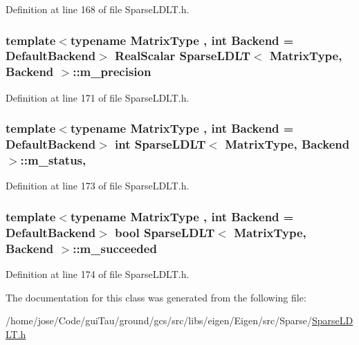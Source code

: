 Definition at line 168 of file Sparse\-L\-D\-L\-T.\-h.

\hypertarget{class_sparse_l_d_l_t_a109b6c84b18d97c92a08379d373a7975}{
\subsubsection[{m\-\_\-precision}]{\setlength{\rightskip}{0pt plus 5cm}template$<$typename Matrix\-Type , int Backend = Default\-Backend$>$ {\bf Real\-Scalar} {\bf Sparse\-L\-D\-L\-T}$<$ Matrix\-Type, Backend $>$\-::m\-\_\-precision\hspace{0.3cm}{\ttfamily [protected]}}}\label{class_sparse_l_d_l_t_a109b6c84b18d97c92a08379d373a7975}


Definition at line 171 of file Sparse\-L\-D\-L\-T.\-h.

\hypertarget{class_sparse_l_d_l_t_a4d237375d5b6e0db431f05c373143031}{
\subsubsection[{m\-\_\-status}]{\setlength{\rightskip}{0pt plus 5cm}template$<$typename Matrix\-Type , int Backend = Default\-Backend$>$ {\bf int} {\bf Sparse\-L\-D\-L\-T}$<$ Matrix\-Type, Backend $>$\-::m\-\_\-status\hspace{0.3cm}{\ttfamily [mutable]}, {\ttfamily [protected]}}}\label{class_sparse_l_d_l_t_a4d237375d5b6e0db431f05c373143031}


Definition at line 173 of file Sparse\-L\-D\-L\-T.\-h.

\hypertarget{class_sparse_l_d_l_t_a478a3388edfd9e7d7356e311b457ed9f}{
\subsubsection[{m\-\_\-succeeded}]{\setlength{\rightskip}{0pt plus 5cm}template$<$typename Matrix\-Type , int Backend = Default\-Backend$>$ bool {\bf Sparse\-L\-D\-L\-T}$<$ Matrix\-Type, Backend $>$\-::m\-\_\-succeeded\hspace{0.3cm}{\ttfamily [protected]}}}\label{class_sparse_l_d_l_t_a478a3388edfd9e7d7356e311b457ed9f}


Definition at line 174 of file Sparse\-L\-D\-L\-T.\-h.



The documentation for this class was generated from the following file\-:\begin{DoxyCompactItemize}
\item 
/home/jose/\-Code/gui\-Tau/ground/gcs/src/libs/eigen/\-Eigen/src/\-Sparse/\hyperlink{_sparse_l_d_l_t_8h}{Sparse\-L\-D\-L\-T.\-h}\end{DoxyCompactItemize}
